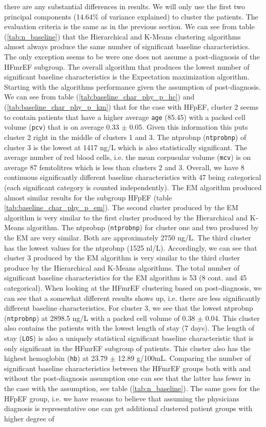 \documentclass[../thesis.tex]{subfiles}
\begin{document}
\noindent there are any substantial differences in results. We will only use the first two principal components (14.64\% of variance explained) to cluster the patients. The evaluation criteria is the same as in the previous section. We can see from table (\ref{tab:n_baseline}) that the Hierarchical and K-Means clustering algorithms almost always produce the same number of significant baseline characteristics. The only exception seems to be were one does not assume a post-diagnosis of the HFmrEF subgroup. The overall algorithm that produces the lowest number of significant baseline characteristics is the Expectation maximization algorithm. Starting with the algorithms performance given the assumption of post-diagnosis. We can see from table (\ref{tab:baseline_char_phy_p_hc}) and (\ref{tab:baseline_char_phy_p_km}) that for the case with HFpEF, cluster 2 seems to contain patients that have a higher average \texttt{age} (85.45) with a packed cell volume (\texttt{pcv}) that is on average 0.33 $\pm$ 0.05. Given this information this puts cluster 2 right in the middle of clusters 1 and 3. The ntprobnp (\texttt{ntprobnp}) of cluster 3 is the lowest at 1417 ng/L which is also statistically significant. The average number of red blood cells, i.e. the mean corpusular volume (\texttt{mcv}) is on average 87 femtolitres which is less than clusters 2 and 3. Overall, we have 8 continuous significantly different baseline characteristics with 47 being categorical (each significant category is counted independently). The EM algorithm produced almost similar results for the subgroup HFpEF (table \ref{tab:baseline_char_phy_p_em}). The second cluster produced by the EM algorithm is very similar to the first cluster produced by the Hierarchical and K-Means algorithm. The ntprobnp (\texttt{ntprobnp}) for cluster one and two produced by the EM are very similar. Both are approximately 2750 ng/L. The third cluster has the lowest values for the ntprobnp (1525 nl/L). Accordingly, we can see that cluster 3 produced by the EM algorithm is very similar to the third cluster produce by the Hierarchical and K-Means algorithms. The total number of significant baseline characteristics for the EM algorithm is 53 (8 cont. and 45 categorical). When looking at the HFmrEF clustering based on post-diagnosis, we can see that a somewhat different results shows up, i.e. there are less significantly different baseline characteristics. For cluster 3, we see that the lowest ntprobnp (\texttt{ntprobnp}) at 2898.5 ng/L with a packed cell volume of 0.38 $\pm$ 0.04. This cluster also contains the patients with the lowest length of stay (7 days). The length of stay (\texttt{LOS}) is also a uniquely statistical significant baseline characteristic that is only significant in the HFmrEF subgroup of patients. This cluster also has the highest hemoglobin (\texttt{hb}) at 23.79 $\pm$ 12.89 g/100mL. Comparing the number of significant baseline characteristics between the HFmrEF groups both with and without the post-diagnosis assumption one can see that the latter has fewer in the case with the assumption, see table (\ref{tab:n_baseline}). The same goes for the HFpEF group, i.e. we have reasons to believe that assuming the physicians diagnosis is representative one can get additional clustered patient groups with higher degree of 
\end{document}
